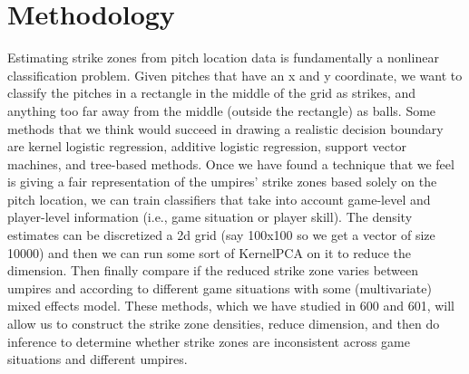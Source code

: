 \documentclass[bj, preprint]{imsart}
\begin{document}
\section{Methodology}\label{sec:method}
Estimating strike zones from pitch location data is fundamentally a nonlinear classification problem. 
Given pitches that have an x and y coordinate, we want to classify the pitches in a rectangle in the middle of the grid as strikes, and anything too far away from the middle (outside the rectangle) as balls.
Some methods that we think would succeed in drawing a realistic decision boundary are kernel logistic regression, additive logistic regression, support vector machines, and tree-based methods. 
Once we have found a technique that we feel is giving a fair representation of the umpires' strike zones based solely on the pitch location, we can train classifiers that take into account game-level and player-level information (i.e., game situation or player skill).
The density estimates can be discretized a 2d grid (say 100x100 so we get a vector of size 10000) and then we can run some sort of KernelPCA on it to reduce the dimension.
Then finally compare if the reduced strike zone varies between umpires and according to different game situations with some 
(multivariate) mixed effects model.
These methods, which we have studied in 600 and 601, will allow us to construct the strike zone densities, reduce dimension, and then do inference to determine whether strike zones are inconsistent across game situations and different umpires.


{}
\end{document}
